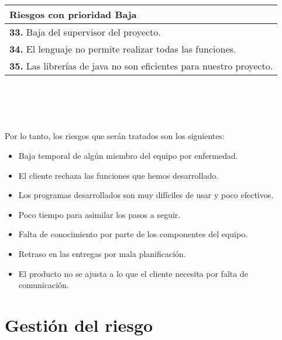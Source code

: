\documentclass[spanish,a4paper,12pt]{report}	%
\begin{document}
			\begin{tabular}{|p{12cm}|}
				\hline
				\textbf{Riesgos con prioridad Baja}\\ \hline \hline
				\textbf{33.} Baja del supervisor del proyecto.\\ \hline 
				\textbf{34.} El lenguaje no permite realizar todas las funciones.\\ \hline
				\textbf{35.} Las librerías de java no son eficientes para nuestro proyecto. \\ \hline
			\end{tabular}
			\ \\
			\ \\
			\ \\
			\ \\
			Por lo tanto, los riesgos que serán tratados son los siguientes:
			\begin{itemize}
			  \item Baja temporal de algún miembro del equipo por enfermedad.
			  \item El cliente rechaza las funciones que hemos desarrollado.
			  \item Los programas desarrollados son muy difíciles de usar y poco efectivos.
			  \item Poco tiempo para asimilar los pasos a seguir. 
			  \item Falta de conocimiento por parte de los componentes del equipo. 
			  \item Retraso en las entregas por mala planificación. 
			  \item El producto no se ajusta a lo que el cliente necesita por falta de comunicación. 
			\end{itemize}
			

 
\newpage
\mbox{}
\thispagestyle{empty}						%
\newpage
 
\part{Gestión del riesgo}
\end{document}
